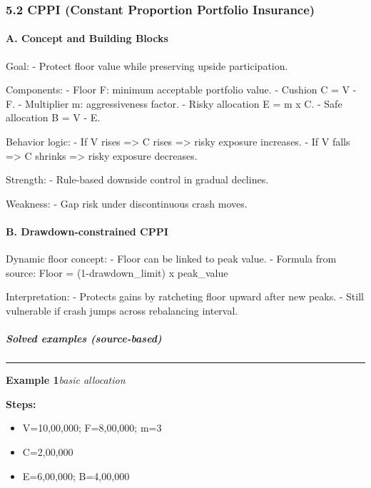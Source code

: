 \documentclass[
]{article}
\begin{document}
\hypertarget{cppi-constant-proportion-portfolio-insurance}{%
\subsubsection{5.2 CPPI (Constant Proportion Portfolio
Insurance)}\label{cppi-constant-proportion-portfolio-insurance}}

\hypertarget{a.-concept-and-building-blocks}{%
\paragraph{A. Concept and Building
Blocks}\label{a.-concept-and-building-blocks}}

Goal: - Protect floor value while preserving upside participation.

Components: - Floor F: minimum acceptable portfolio value. - Cushion C =
V - F. - Multiplier m: aggressiveness factor. - Risky allocation E = m x
C. - Safe allocation B = V - E.

Behavior logic: - If V rises =\textgreater{} C rises =\textgreater{}
risky exposure increases. - If V falls =\textgreater{} C shrinks
=\textgreater{} risky exposure decreases.

Strength: - Rule-based downside control in gradual declines.

Weakness: - Gap risk under discontinuous crash moves.

\hypertarget{b.-drawdown-constrained-cppi}{%
\paragraph{B. Drawdown-constrained
CPPI}\label{b.-drawdown-constrained-cppi}}

Dynamic floor concept: - Floor can be linked to peak value. - Formula
from source: Floor = (1-drawdown\_limit) x peak\_value

Interpretation: - Protects gains by ratcheting floor upward after new
peaks. - Still vulnerable if crash jumps across rebalancing interval.

\hypertarget{solved-examples-source-based-7}{%
\subparagraph{Solved examples
(source-based)}\label{solved-examples-source-based-7}}


\medskip
\noindent\rule{\linewidth}{0.4pt}
\noindent\textbf{Example 1}\enspace\textit{basic allocation}

\noindent\textbf{Steps:}
\begin{itemize}\setlength{\itemsep}{3pt}
  \item V=10,00,000; F=8,00,000; m=3
  \item C=2,00,000
  \item E=6,00,000; B=4,00,000
\end{itemize}
\end{document}
